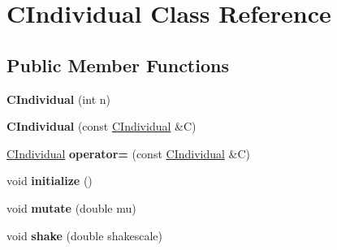 \hypertarget{class_c_individual}{}\section{C\+Individual Class Reference}
\label{class_c_individual}
\subsection*{Public Member Functions}
\begin{DoxyCompactItemize}
\item 
\mbox{\label{class_c_individual_a5499e3acbe12670f73d95f36c00bf8c6}} 
{\bfseries C\+Individual} (int n)
\item 
\mbox{\label{class_c_individual_aaffb1c345f2e88638875be918e12d491}} 
{\bfseries C\+Individual} (const \hyperlink{class_c_individual}{C\+Individual} \&C)
\item 
\mbox{\label{class_c_individual_a7aafaf915575aa9d2a118e34152c2f04}} 
\hyperlink{class_c_individual}{C\+Individual} {\bfseries operator=} (const \hyperlink{class_c_individual}{C\+Individual} \&C)
\item 
\mbox{\label{class_c_individual_a75526b341a075d56577e52db02b7a85f}} 
void {\bfseries initialize} ()
\item 
\mbox{\label{class_c_individual_a57872dc367fb8cc07ca2d90b7efc6c27}} 
void {\bfseries mutate} (double mu)
\item 
\mbox{\label{class_c_individual_a0fbe8581e789a590519311adb674237c}} 
void {\bfseries shake} (double shakescale)
\end{DoxyCompactItemize}
